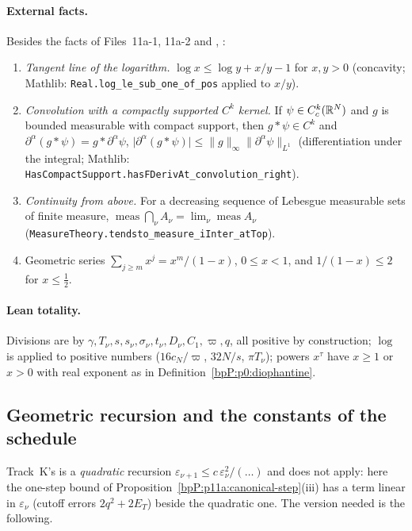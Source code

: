 \paragraph{External facts.} Besides the facts of Files~11a-1, 11a-2 and , :
\begin{enumerate}[label=(Y\arabic*),ref=(Y\arabic*)]
\item\label{bpP:p11a:y-log} \emph{Tangent line of the logarithm.} $\log x\le\log y+x/y-1$ for $x,y>0$ (concavity; Mathlib: \nolinkurl{Real.log_le_sub_one_of_pos} applied to $x/y$).
\item\label{bpP:p11a:y-conv} \emph{Convolution with a compactly supported $C^k$ kernel.} If $\psi\in C^k_c(\mathbb{R}^N)$ and $g$ is bounded measurable with compact support, then $g*\psi\in C^k$ and $\partial^\alpha(g*\psi)=g*\partial^\alpha\psi$, $\lvert\partial^\alpha(g*\psi)\rvert\le\lVert g\rVert_\infty\lVert\partial^\alpha\psi\rVert_{L^1}$ (differentiation under the integral; Mathlib: \nolinkurl{HasCompactSupport.hasFDerivAt_convolution_right}).
\item\label{bpP:p11a:y-down} \emph{Continuity from above.} For a decreasing sequence of Lebesgue measurable sets of finite measure, $\operatorname{meas}\bigcap_\nu A_\nu=\lim_\nu\operatorname{meas}A_\nu$ (\nolinkurl{MeasureTheory.tendsto_measure_iInter_atTop}).
\item\label{bpP:p11a:y-geom} Geometric series $\sum_{j\ge m}x^j=x^m/(1-x)$, $0\le x<1$, and $1/(1-x)\le2$ for $x\le\frac12$.
\end{enumerate}

\paragraph{Lean totality.} Divisions are by $\gamma,T_\nu,s,s_\nu,\sigma_\nu,t_\nu,D_\nu,C_1,\varpi,q$, all positive by construction; $\log$ is applied to positive numbers ($16c_N/\varpi$, $32N/s$, $\pi T_\nu$); powers $x^{\tau}$ have $x\ge1$ or $x>0$ with real exponent as in Definition~\ref{bpP:p0:diophantine}.

\subsection{Geometric recursion and the constants of the schedule}\label{bpP:p11a:sec-consts}

Track~K's  is a \emph{quadratic} recursion $\varepsilon_{\nu+1}\le c\,\varepsilon_\nu^2/(\ldots)$ and does not apply: here the one-step bound of Proposition~\ref{bpP:p11a:canonical-step}(iii) has a term linear in $\varepsilon_\nu$ (cutoff errors $2q^2+2E_T$) beside the quadratic one. The version needed is the following.

